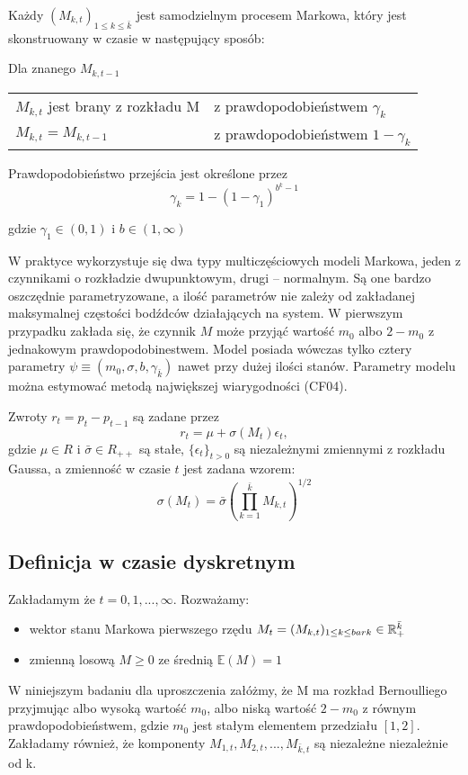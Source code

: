 \documentclass[12pt]{article}
\theoremstyle{definition}
\begin{document}
Każdy $(M_{k, t})_{1 \leq k \leq \bar{k}}$ jest samodzielnym procesem Markowa, który jest skonstruowany w czasie w następujący sposób:

Dla znanego  $M_{k, t-1}$

\begin{tabular}{l l}
$M_{k, t}$ jest brany z rozkładu M & z prawdopodobieństwem $\gamma_k$\\
$M_{k, t} = M_{k, t-1}$ & z prawdopodobieństwem $1 - \gamma_k$\\
\end{tabular}

Prawdopodobieństwo przejścia jest określone przez
\begin{equation}
\label{3.1}
\gamma_k = 1 - (1 - \gamma_1)^{b^k - 1}
\end{equation}


gdzie $\gamma_1 \in (0, 1)$ i $b \in (1, \infty)$

W praktyce wykorzystuje się dwa typy multiczęściowych modeli Markowa, jeden z czynnikami o rozkładzie dwupunktowym, drugi – normalnym. Są one bardzo oszczędnie parametryzowane, a ilość parametrów nie zależy od zakładanej maksymalnej częstości bodźdców działających na system.  W pierwszym przypadku zakłada się, że czynnik $M$ może przyjąć wartość $m_0$ albo $2 - m_0$ z jednakowym prawdopodobinestwem. Model posiada wówczas tylko cztery parametry $\psi \equiv (m_0, \sigma, b, \gamma_{\bar{k}})$ nawet przy dużej ilości stanów. Parametry modelu można estymować metodą największej wiarygodności (CF04).

Zwroty $r_t = p_t - p_{t-1}$ są zadane przez 
\begin{equation}
\label{3.2}
r_t = \mu + \sigma (M_t)\epsilon_t,
\end{equation}
gdzie $\mu \in R$ i $ \bar{\sigma} \in R_{++}$ są stałe, $\{\epsilon_t\}_{t>0}$ są niezależnymi zmiennymi z rozkładu Gaussa, a zmienność w czasie $t$ jest zadana wzorem: 
\begin{equation}
\label{3.3}
\sigma(M_t) = \bar{\sigma} (\prod_{k=1}^{\bar{k}} M_{k, t})^{1/2} 
\end{equation} 


\subsection{Definicja w czasie dyskretnym}
Zakładamym że $t = 0, 1, ..., \infty$. Rozważamy:
\begin{itemize}
\item wektor stanu Markowa pierwszego rzędu $M_t = (M_{k, t})_{1 \leq k \leq \\bar{k}} \in \mathbb{R}^{\bar{k}}_+$
\item zmienną losową $M \geq 0$ ze średnią $\mathbb{E}(M) = 1 $
\end{itemize}
W niniejszym badaniu dla uproszczenia załóżmy, że M ma rozkład Bernoulliego przyjmując albo wysoką wartość $m_0$, albo niską wartość $2-m_0$ z równym prawdopodobieństwem, gdzie $m_0$ jest stałym elementem przedziału $[1,2]$. Zakładamy również, że komponenty $M_{1,t}, M_{2,t}, ..., M_{\bar{k},t}$ są niezależne niezależnie od k.
\end{document}
